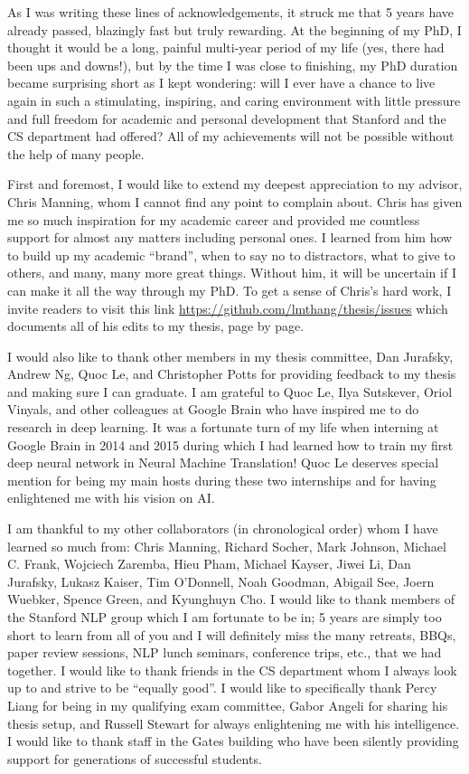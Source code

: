 As I was writing these lines of acknowledgements, it struck me that 5 years have
already passed, blazingly fast but truly rewarding. At the beginning of my PhD,
I thought it would be a long, painful multi-year period of my life (yes, there
had been ups and downs!), but by the time I was close to finishing, my PhD
duration became surprising short as I kept wondering: will I ever have a chance
to live again in such a stimulating, inspiring, and caring environment with
little pressure and full freedom for academic and personal development that
Stanford and the CS department had offered? All of my achievements will not be
possible without the help of many people.

First and foremost, I would like to extend my deepest appreciation to my
advisor, Chris Manning, whom I cannot find any point to complain about. Chris
has given me so much inspiration for my academic career and provided me
countless support for almost any matters including personal ones. I learned from
him how to build up my academic ``brand'', when to say no to distractors,
what to give to others, and many, many more great things.
Without him, it will be uncertain
if I can make it all the way through my PhD. To get a sense of Chris's hard work,
I invite readers to visit this link
\url{https://github.com/lmthang/thesis/issues} which documents all of his edits
to my thesis, page by page.

I would also like to thank other members in my thesis committee, Dan Jurafsky,
Andrew Ng, Quoc Le, and Christopher Potts for providing feedback to my thesis
and making sure I can graduate. I am grateful to Quoc Le, Ilya Sutskever,
Oriol Vinyals, and other colleagues at Google Brain who have inspired me to do
research in deep learning. It was a fortunate turn of my life when interning at
Google Brain in 2014 and 2015 during which I had learned how to train my first
deep neural network in Neural Machine Translation! Quoc Le deserves special
mention for being my main hosts during these two internships and for having
enlightened me with his vision on AI.


I am thankful to my other collaborators (in chronological order) whom I have
learned so much from: Chris Manning, Richard Socher, Mark Johnson, Michael C. Frank,
Wojciech Zaremba, Hieu Pham, Michael Kayser, Jiwei Li, Dan Jurafsky, Lukasz Kaiser, Tim
O'Donnell, Noah Goodman, Abigail See, Joern Wuebker, Spence Green, and Kyunghuyn Cho.
I would like to thank members of the
Stanford NLP group which I am fortunate to be in; 5 years are simply too short
to learn from all of you and I will definitely miss the many retreats, BBQs,
paper review sessions, NLP lunch seminars, conference trips, etc., that we had
together. I would like to thank friends in the CS department whom I always look
up to and strive to be ``equally good''. I would like to specifically thank Percy
Liang for being in my qualifying exam committee, Gabor Angeli for sharing his
thesis setup, and Russell Stewart for always
enlightening me with his intelligence. I would like to thank staff in the Gates
building who have been silently providing support for generations of successful
students.

